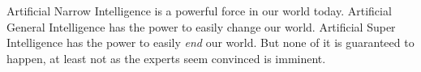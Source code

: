 \documentclass[12pt]{article} %
\begin{document}
Artificial Narrow Intelligence is a powerful force in our world today. Artificial General Intelligence has the power to easily change our world. Artificial Super Intelligence has the power to easily \textit{end} our world. But none of it is guaranteed to happen, at least not as the experts seem convinced is imminent.


\newpage %




\end{document}
